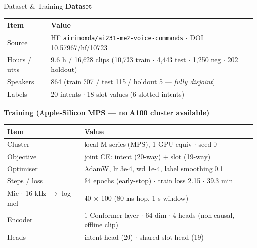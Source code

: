 \documentclass[aspectratio=169,10pt]{beamer}
\begin{document}
\begin{frame}{Dataset \& Training}
\small
\textbf{Dataset}
\begin{table}
\centering
\begin{tabular}{@{}ll@{}}
\toprule
\textbf{Item} & \textbf{Value} \\
\midrule
Source & HF \texttt{airimonda/ai231-me2-voice-commands} $\cdot$ DOI 10.57967/hf/10723 \\
Hours / utts & 9.6 h / 16,628 clips (10,733 train $\cdot$ 4,443 test $\cdot$ 1,250 neg $\cdot$ 202 holdout) \\
Speakers & 864 (train 307 / test 115 / holdout 5 --- \emph{fully disjoint}) \\
Labels & 20 intents $\cdot$ 18 slot values (6 slotted intents) \\
\bottomrule
\end{tabular}
\end{table}

\vspace{0.4em}
\textbf{Training (Apple-Silicon MPS --- no A100 cluster available)}
\begin{table}
\centering
\begin{tabular}{@{}ll@{}}
\toprule
\textbf{Item} & \textbf{Value} \\
\midrule
Cluster & local M-series (MPS), 1 GPU-equiv $\cdot$ seed 0 \\
Objective & joint CE: intent (20-way) + slot (19-way) \\
Optimiser & AdamW, lr 3e-4, wd 1e-4, label smoothing 0.1 \\
Steps / loss & 84 epochs (early-stop) $\cdot$ train loss 2.15 $\cdot$ 39.3 min \\
Mic $\cdot$ 16 kHz $\rightarrow$ log-mel & 40 $\times$ 100 (80 ms hop, 1 s window) \\
Encoder & 1 Conformer layer $\cdot$ 64-dim $\cdot$ 4 heads (non-causal, offline clip) \\
Heads & intent head (20) $\cdot$ shared slot head (19) \\
\bottomrule
\end{tabular}
\end{table}
\end{frame}
\end{document}
